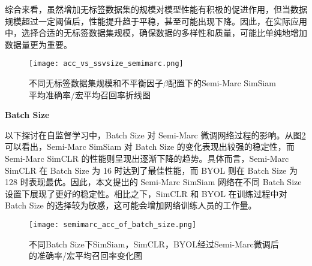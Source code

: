 \documentclass[master]{thesis-uestc}
\begin{document}
综合来看，虽然增加无标签数据集的规模对模型性能有积极的促进作用，但当数据规模超过一定阈值后，性能提升趋于平稳，甚至可能出现下降。因此，在实际应用中，选择合适的无标签数据集规模，确保数据的多样性和质量，可能比单纯地增加数据量更为重要。

\begin{figure}[h]
    \centering
    \texttt{[image: acc\_vs\_ssvsize\_semimarc.png]}
    \caption{不同无标签数据集规模和不平衡因子$\beta$配置下的Semi-Marc SimSiam平均准确率/宏平均召回率折线图}
    \label{acc_vs_ssvsize_semimarc}
\end{figure}

\textbf{Batch Size}

以下探讨在自监督学习中，Batch Size 对 Semi-Marc 微调网络过程的影响。从图\ref{semimarc_acc_of_batch_size}可以看出，Semi-Marc SimSiam 对 Batch Size 的变化表现出较强的稳定性，而 Semi-Marc SimCLR 的性能则呈现出逐渐下降的趋势。具体而言，Semi-Marc SimCLR 在 Batch Size 为 16 时达到了最佳性能，而 BYOL 则在 Batch Size 为 128 时表现最优。因此，本文提出的 Semi-Marc SimSiam 网络在不同 Batch Size 设置下展现了更好的稳定性。相比之下，SimCLR 和 BYOL 在训练过程中对 Batch Size 的选择较为敏感，这可能会增加网络训练人员的工作量。

\begin{figure}[h]
    \centering
    \texttt{[image: semimarc\_acc\_of\_batch\_size.png]}
    \caption{不同Batch Size下SimSiam，SimCLR，BYOL经过Semi-Marc微调后的准确率/宏平均召回率变化图}
    \label{semimarc_acc_of_batch_size}
\end{figure}
\end{document}
